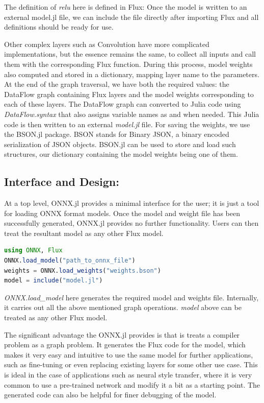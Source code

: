 \documentclass{juliacon}
\begin{document}
The definition of \textit{relu} here is defined in Flux: Once the model is written to an external model.jl file,
we can include the file directly after importing Flux and all definitions should be ready for use. 

Other complex layers such as Convolution have more complicated implementations, but the essence remains the same,
to collect all inputs and call them with the corresponding Flux function. During this process, model weights 
also computed and stored in a dictionary, mapping layer name to the parameters. At the end of the graph traversal,
we have both the required values: the DataFlow graph containing Flux layers and the model weights corresponding to
each of these layers. The DataFlow graph can converted to Julia code using \textit{DataFlow.syntax} that also
assigns variable names as and when needed. This Julia code is then written to an external \textit{model.jl} file.
For saving the weights, we use the BSON.jl package. BSON stands for Binary JSON, a binary encoded serialization
of JSON objects. BSON.jl \cite{BSON.jl} can be used to store and load such structures, our dictionary containing the model weights being one of them.
\subsection{Interface and Design:}
At a top level, ONNX.jl provides a minimal interface for the user; it is just a tool for loading ONNX format
models. Once the model and weight file has been successfully generated, ONNX.jl provides no further functionality.
Users can then treat the resultant model as any other Flux model.  

\begin{lstlisting}[language=Julia]
using ONNX, Flux
ONNX.load_model("path_to_onnx_file")
weights = ONNX.load_weights("weights.bson")
model = include("model.jl")
\end{lstlisting}{}

\textit{ONNX.load\_model} here generates the required model and weights file. Internally, it carries out all the 
above mentioned graph operations. \textit{model} above can be treated as any other Flux model.  

The significant advantage the ONNX.jl provides is that is treats a compiler problem as a graph problem. It 
generates the Flux code for the model, which makes it very easy and intuitive to use the same model for
further applications, such as fine-tuning or even replacing existing layers for some other use case. This
is ideal in the case of applications such as neural style transfer, where it is very common to use a pre-trained
network and modify it a bit as a starting point. The generated code can also be helpful for finer debugging of 
the model.  
\end{document}
